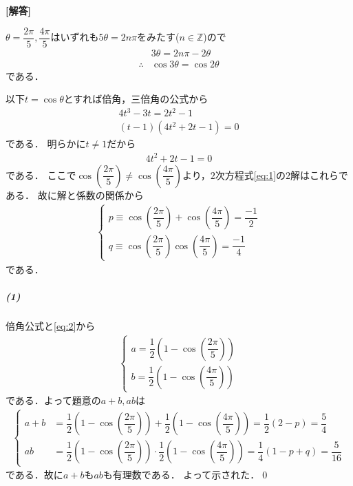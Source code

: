 \documentclass[../../main.tex]{subfiles}
\begin{document}
\begin{oframed}
  
\end{oframed}

{\bf [解答]}

$\theta=\dfrac{2\pi}{5},\dfrac{4\pi}{5}$はいずれも$5\theta=2n\pi$をみたす($n\in\mathbb{Z}$)ので
\begin{align}
  &3\theta=2n\pi-2\theta \\
  \therefore
  &\cos3\theta=\cos2\theta
\end{align}
である．

以下$t=\cos\theta$とすれば倍角，三倍角の公式から
\begin{align}
  4t^3-3t=2t^2-1      \\
  (t-1)(4t^2+2t-1)=0
\end{align}
である．
明らかに$t \neq 1$だから
\begin{align}
  4t^2+2t-1 = 0 \label{eq:1}
\end{align}
である．
ここで$\cos\left(\dfrac{2\pi}{5}\right) \neq \cos\left(\dfrac{4\pi}{5}\right)$より，$2$次方程式\cref{eq:1}の$2$解はこれらである．
故に解と係数の関係から
\begin{align}
  \begin{cases}
    p\equiv\cos\left(\dfrac{2\pi}{5}\right)+\cos\left(\dfrac{4\pi}{5}\right)=\dfrac{-1}{2}  \\
    q\equiv\cos\left(\dfrac{2\pi}{5}\right)\cos\left(\dfrac{4\pi}{5}\right)=\dfrac{-1}{4}
  \end{cases} \label{eq:2}
\end{align}
である．

\subparagraph{(1)}

倍角公式と\cref{eq:2}から
\begin{align}
  \begin{cases}
    a = \dfrac{1}{2}\left(1-\cos\left(\dfrac{2\pi}{5}\right)\right) \\
    b = \dfrac{1}{2}\left(1-\cos\left(\dfrac{4\pi}{5}\right)\right)
  \end{cases}
\end{align}
である．よって題意の$a+b,ab$は
\begin{align}
  \begin{cases}
    a + b & = \dfrac{1}{2}\left(1-\cos\left(\dfrac{2\pi}{5}\right)\right) + \dfrac{1}{2}\left(1-\cos\left(\dfrac{4\pi}{5}\right)\right) = \dfrac{1}{2}(2-p) = \dfrac{5}{4} \\
    ab    & = \dfrac{1}{2}\left(1-\cos\left(\dfrac{2\pi}{5}\right)\right)\cdot\dfrac{1}{2}\left(1-\cos\left(\dfrac{4\pi}{5}\right)\right) = \dfrac{1}{4}\left(1-p+q\right) = \dfrac{5}{16}
  \end{cases} \label{eq:3}
\end{align}
である．故に$a+b$も$ab$も有理数である．
よって示された．\qed
\end{document}
